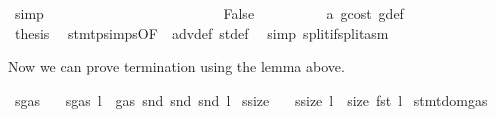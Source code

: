 \begin{isabellebody}
\ simp\isanewline
\ \ \ \ \ \ \ \ \isamarkupfalse%
\isanewline
\ \ \ \ \ \ \isamarkupfalse%
\isanewline
\ \ \ \ \ \ \ \ \isamarkupfalse%
\ False\isanewline
\ \ \ \ \ \ \ \ \isamarkupfalse%
\ a{}\ gcost\ g{\isacharunderscore}{\kern0pt}def\isanewline
\ \ \ \ \ \ \ \ \isamarkupfalse%
\ {\isacharquery}{\kern0pt}thesis\ \isamarkupfalse%
\ stmt{\isachardot}{\kern0pt}psimps{\isacharparenleft}{\kern0pt}{}{}{\isacharparenright}{\kern0pt}{\isacharbrackleft}{\kern0pt}OF\ {}{}{\isacharparenleft}{\kern0pt}{}{\isacharparenright}{\kern0pt}{\isacharbrackright}{\kern0pt}\ adv{\isacharunderscore}{\kern0pt}def\ st{\isacharprime}{\kern0pt}{\isacharunderscore}{\kern0pt}def\ \isamarkupfalse%
\ {\isacharparenleft}{\kern0pt}simp\ split{\isacharcolon}{\kern0pt}if{\isacharunderscore}{\kern0pt}split{\isacharunderscore}{\kern0pt}asm{\isacharparenright}{\kern0pt}\isanewline
\ \ \ \ \ \ \isamarkupfalse%
\isanewline
\ \ \ \ \isamarkupfalse%
\isanewline
\ \ \isamarkupfalse%
\isanewline
{}\isamarkupfalse%
%
\endisatagproof
{\isafoldproof}%
%
\isadelimproof
%
\endisadelimproof
%
\isadelimdocument
%
\endisadelimdocument
%
\isatagdocument
%
\isamarkuptrue%
%
\endisatagdocument
{\isafolddocument}%
%
\isadelimdocument
%
\endisadelimdocument
%
\begin{isamarkuptext}%
Now we can prove termination using the lemma above.%
\end{isamarkuptext}\isamarkuptrue%
\isamarkupfalse%
\ sgas\isanewline
\ \ \ {\isachardoublequoteopen}sgas\ l\ {\isacharequal}{\kern0pt}\ gas\ {\isacharparenleft}{\kern0pt}snd\ {\isacharparenleft}{\kern0pt}snd\ {\isacharparenleft}{\kern0pt}snd\ l{\isacharparenright}{\kern0pt}{\isacharparenright}{\kern0pt}{\isacharparenright}{\kern0pt}{\isachardoublequoteclose}\isanewline
\isanewline
{}\isamarkupfalse%
\ ssize\isanewline
\ \ \ {\isachardoublequoteopen}ssize\ l\ {\isacharequal}{\kern0pt}\ size\ {\isacharparenleft}{\kern0pt}fst\ l{\isacharparenright}{\kern0pt}{\isachardoublequoteclose}\isanewline
\isanewline
{}\isamarkupfalse%
\ stmt{\isacharunderscore}{\kern0pt}dom{\isacharunderscore}{\kern0pt}gas\ {\isacharequal}{\kern0pt}\isanewline

\end{isabellebody}
